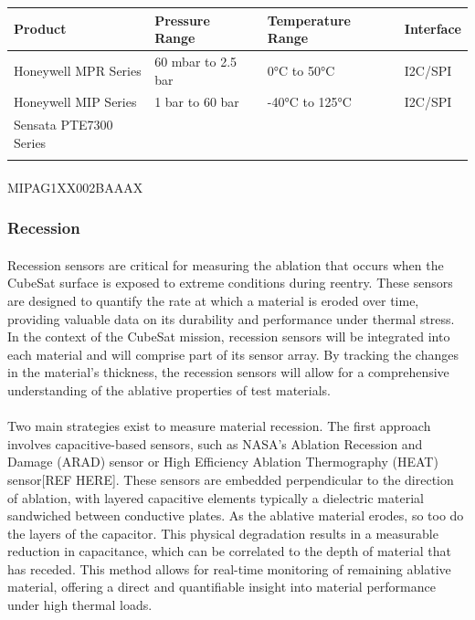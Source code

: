 \documentclass[11pt]{article}
\begin{document}
	\begin{center}
		\begin{tabular}{|p{4cm}|p{3cm}|p{3cm}|p{3cm}|}
			\hline
			\bf{Product} & \bf{Pressure Range} & \bf{Temperature Range} & \bf{Interface} \\ \hline
			Honeywell MPR Series & 60 mbar to 2.5 bar & 0°C to 50°C & I2C/SPI\\ \hline
			Honeywell MIP Series &  1 bar to 60 bar & -40°C to 125°C & I2C/SPI\\ \hline
			Sensata PTE7300 Series & & & \\ \hline
			& & & \\ \hline
		\end{tabular}
	\end{center}
	
	\paragraph{}MIPAG1XX002BAAAX
	
	
	\subsubsection{Recession}
	
	\paragraph{}Recession sensors are critical for measuring the ablation that occurs when the CubeSat surface is exposed to extreme conditions during reentry. These sensors are designed to quantify the rate at which a material is eroded over time, providing valuable data on its durability and performance under thermal stress. In the context of the CubeSat mission, recession sensors will be integrated into each material and will comprise part of its sensor array. By tracking the changes in the material’s thickness, the recession sensors will allow for a comprehensive understanding of the ablative properties of test materials.
	
	\paragraph{}Two main strategies exist to measure material recession. The first approach involves capacitive-based sensors, such as NASA’s Ablation Recession and Damage (ARAD) sensor or High Efficiency Ablation Thermography (HEAT) sensor[REF HERE]. These sensors are embedded perpendicular to the direction of ablation, with layered capacitive elements typically a dielectric material sandwiched between conductive plates. As the ablative material erodes, so too do the layers of the capacitor. This physical degradation results in a measurable reduction in capacitance, which can be correlated to the depth of material that has receded. This method allows for real-time monitoring of remaining ablative material, offering a direct and quantifiable insight into material performance under high thermal loads.
	
\end{document}
